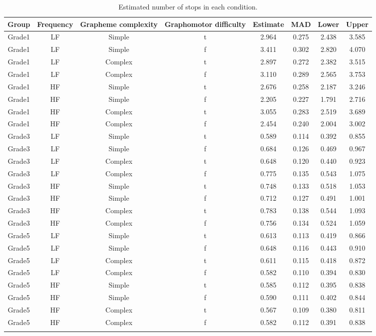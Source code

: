 \documentclass[
  11pt,
  english,
  ,doc,mask,floatsintext]{apa6}
\begin{document}
\begin{table}[htb]

\begin{center}
\begin{threeparttable}

\caption{\label{tab:stops-predictions-summary}Estimated number of stops in each condition.}

\scriptsize{

\begin{tabular}{cccccccc}
\toprule
Group & \multicolumn{1}{c}{Frequency} & \multicolumn{1}{c}{Grapheme complexity} & \multicolumn{1}{c}{Graphomotor difficulty} & \multicolumn{1}{c}{Estimate} & \multicolumn{1}{c}{MAD} & \multicolumn{1}{c}{Lower} & \multicolumn{1}{c}{Upper}\\
\midrule
Grade1 & LF & Simple & t & 2.964 & 0.275 & 2.438 & 3.585\\
Grade1 & LF & Simple & f & 3.411 & 0.302 & 2.820 & 4.070\\
Grade1 & LF & Complex & t & 2.897 & 0.272 & 2.382 & 3.515\\
Grade1 & LF & Complex & f & 3.110 & 0.289 & 2.565 & 3.753\\
Grade1 & HF & Simple & t & 2.676 & 0.258 & 2.187 & 3.246\\
Grade1 & HF & Simple & f & 2.205 & 0.227 & 1.791 & 2.716\\
Grade1 & HF & Complex & t & 3.055 & 0.283 & 2.519 & 3.689\\
Grade1 & HF & Complex & f & 2.454 & 0.240 & 2.004 & 3.002\\
Grade3 & LF & Simple & t & 0.589 & 0.114 & 0.392 & 0.855\\
Grade3 & LF & Simple & f & 0.684 & 0.126 & 0.469 & 0.967\\
Grade3 & LF & Complex & t & 0.648 & 0.120 & 0.440 & 0.923\\
Grade3 & LF & Complex & f & 0.775 & 0.135 & 0.543 & 1.075\\
Grade3 & HF & Simple & t & 0.748 & 0.133 & 0.518 & 1.053\\
Grade3 & HF & Simple & f & 0.712 & 0.127 & 0.491 & 1.001\\
Grade3 & HF & Complex & t & 0.783 & 0.138 & 0.544 & 1.093\\
Grade3 & HF & Complex & f & 0.756 & 0.134 & 0.524 & 1.059\\
Grade5 & LF & Simple & t & 0.613 & 0.113 & 0.419 & 0.866\\
Grade5 & LF & Simple & f & 0.648 & 0.116 & 0.443 & 0.910\\
Grade5 & LF & Complex & t & 0.611 & 0.115 & 0.418 & 0.872\\
Grade5 & LF & Complex & f & 0.582 & 0.110 & 0.394 & 0.830\\
Grade5 & HF & Simple & t & 0.585 & 0.112 & 0.395 & 0.838\\
Grade5 & HF & Simple & f & 0.590 & 0.111 & 0.402 & 0.844\\
Grade5 & HF & Complex & t & 0.567 & 0.109 & 0.380 & 0.811\\
Grade5 & HF & Complex & f & 0.582 & 0.112 & 0.391 & 0.838\\
\bottomrule
\addlinespace
\end{tabular}

}
\end{threeparttable}
\end{center}
\end{table}
\end{document}
